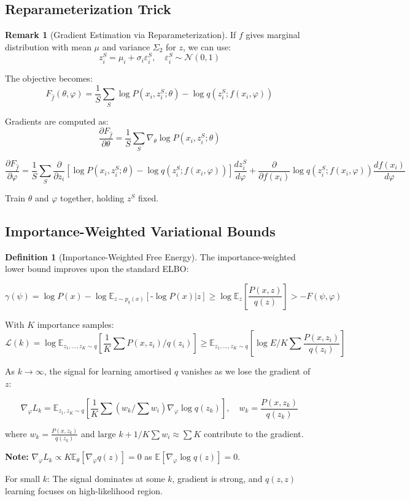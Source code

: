 \documentclass[12pt,a4paper]{article}
\theoremstyle{definition}
\newtheorem{definition}{Definition}[section]
\newtheorem{remark}{Remark}[section]
\begin{document}
\subsection{Reparameterization Trick}

\begin{remark}[Gradient Estimation via Reparameterization]
If $f$ gives marginal distribution with mean $\mu$ and variance $\Sigma_2$ for $z$, we can use:
\[
z_i^S = \mu_i + \sigma_i \varepsilon_i^S, \quad \varepsilon_i^S \sim \mathcal{N}(0, 1)
\]

The objective becomes:
\[
F_{\hat{f}}(\theta, \varphi) = \frac{1}{S} \sum_S \log P(x_i, z_i^S; \theta) - \log q(z_i^S; f(x_i, \varphi))
\]

Gradients are computed as:
\[
\frac{\partial F_{\hat{f}}}{\partial \theta} = \frac{1}{S} \sum_S \nabla_\theta \log P(x_i, z_i^S; \theta)
\]

\[
\frac{\partial F_{\hat{f}}}{\partial \varphi} = \frac{1}{S} \sum_S \frac{\partial}{\partial z_i} [\log P(x_i, z_i^S; \theta) - \log q(z_i^S; f(x_i, \varphi))] \frac{dz_i^S}{d\varphi} + \frac{\partial}{\partial f(x_i)} \log q(z_i^S; f(x_i, \varphi)) \frac{df(x_i)}{d\varphi}
\]

Train $\theta$ and $\varphi$ together, holding $z^S$ fixed.
\end{remark}

\subsection{Importance-Weighted Variational Bounds}

\begin{definition}[Importance-Weighted Free Energy]
The importance-weighted lower bound improves upon the standard ELBO:

\[
\gamma(\psi) = \log P(x) - \log \mathbb{E}_{z \sim p_q(x)} [\text{-} \log P(x)|z] \geq \log \mathbb{E}_z \left[ \frac{P(x,z)}{q(z)} \right] > -F(\psi, \varphi)
\]

With $K$ importance samples:
\[
\mathcal{L}(k) = \log \mathbb{E}_{z_1, \ldots, z_K \sim q} \left[ \frac{1}{K} \sum P(x, z_i) / q(z_i) \right] \geq \mathbb{E}_{z_1, \ldots, z_K \sim q} \left[ \log E/K \sum \frac{P(x, z_i)}{q(z_i)} \right]
\]

As $k \to \infty$, the signal for learning amortised $q$ vanishes as we lose the gradient of $z$:

\[
\nabla_\varphi L_k = \mathbb{E}_{z_1, z_K \sim q} \left[ \frac{1}{K} \sum (w_k / \sum w_i) \nabla_\varphi \log q(z_k) \right], \quad w_k = \frac{P(x, z_k)}{q(z_k)}
\]

where $w_k = \frac{P(x,z_k)}{q(z_k)}$ and $\text{large } k + 1/K \sum w_i \approx \sum K$ contribute to the gradient.

\textbf{Note:} $\nabla_\varphi L_k \propto K \mathbb{E}_\theta[\nabla_\varphi q(z)] = 0$ as $\mathbb{E}[\nabla_\varphi \log q(z)] = 0$.

For small $k$: The signal dominates at some $k$, gradient is strong, and $q(z,z)$ learning focuses on high-likelihood region.
\end{definition}
\end{document}
